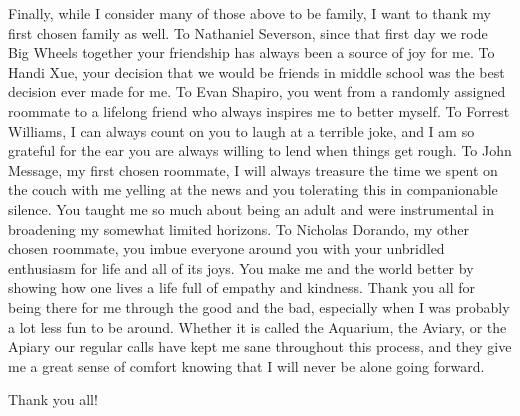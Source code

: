 \documentclass[../main.tex]{subfiles}
\begin{document}
\begin{singlespace}
{{\begin{flushleft}
\end{flushleft}
} %

{\parindent0pt %
\begin{flushleft}
                                                                                 
Finally, while I consider many of those above to be family, I want to thank my first chosen family as well. To Nathaniel Severson, since that first day we rode Big Wheels together your friendship has always been a source of joy for me. To Handi Xue, your decision that we would be friends in middle school was the best decision ever made for me. To Evan Shapiro, you went from a randomly assigned roommate to a lifelong friend who always inspires me to better myself. To Forrest Williams, I can always count on you to laugh at a terrible joke, and I am so grateful for the ear you are always willing to lend when things get rough. To John Message, my first chosen roommate, I will always treasure the time we spent on the couch with me yelling at the news and you tolerating this in companionable silence. You taught me so much about being an adult and were instrumental in broadening my somewhat limited horizons. To Nicholas Dorando, my other chosen roommate, you imbue everyone around you with your unbridled enthusiasm for life and all of its joys. You make me and the world better by showing how one lives a life full of empathy and kindness. Thank you all for being there for me through the good and the bad, especially when I was probably a lot less fun to be around. Whether it is called the Aquarium, the Aviary, or the Apiary our regular calls have kept me sane throughout this process, and they give me a great sense of comfort knowing that I will never be alone going forward.

\end{flushleft}
} %

{\parindent0pt %
\begin{flushleft}
                                                                                 
Thank you all!                                                     

\end{flushleft}
} %

} %
\end{singlespace}
\end{document}
